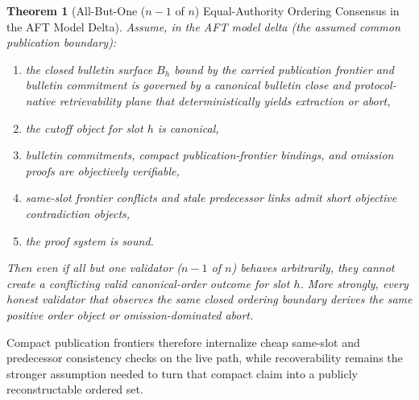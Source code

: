 \documentclass[11pt]{article}
\newtheorem{theorem}{Theorem}
\begin{document}
\begin{theorem}[All-But-One (\(n-1\) of \(n\)) Equal-Authority Ordering Consensus in the AFT Model Delta]
Assume, in the AFT model delta (the assumed common publication boundary):
\begin{enumerate}[leftmargin=1.5em]
\item the closed bulletin surface \(B_h\) bound by the carried publication
frontier and bulletin commitment is governed by a canonical bulletin close and
protocol-native retrievability plane that deterministically yields extraction
or abort,
\item the cutoff object for slot \(h\) is canonical,
\item bulletin commitments, compact publication-frontier bindings, and omission
proofs are objectively verifiable,
\item same-slot frontier conflicts and stale predecessor links admit short
objective contradiction objects,
\item the proof system is sound.
\end{enumerate}
Then even if all but one validator (\(n-1\) of \(n\)) behaves arbitrarily,
they cannot create a
conflicting valid canonical-order outcome for slot \(h\). More strongly,
every honest validator that observes the same closed ordering boundary derives
the same positive order object or omission-dominated abort.
\end{theorem}

Compact publication frontiers therefore internalize cheap same-slot and
predecessor consistency checks on the live path, while recoverability remains
the stronger assumption needed to turn that compact claim into a publicly
reconstructable ordered set.
\end{document}
